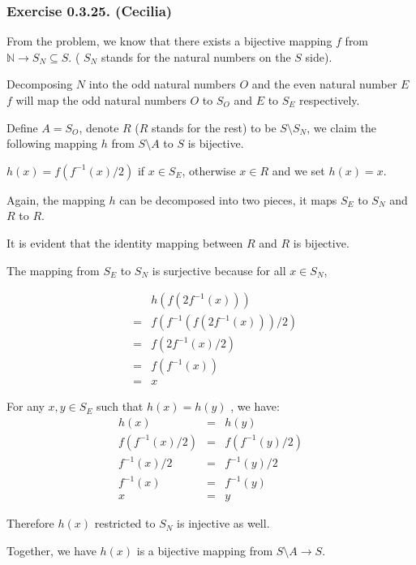 \subsubsection*{Exercise 0.3.25. (Cecilia)}

From the problem, we know that there exists a bijective mapping $ f $ from $ \mathbb{N} \to S_N \subseteq S $. ( $ S_N $ stands for the natural numbers on the $ S $ side).

Decomposing $ N $ into the odd natural numbers $ O $ and the even natural number $ E $ $ f $ will map the odd natural numbers $ O $ to $ S_O $ and $ E $ to $ S_E $ respectively. 

Define $ A = S_O $, denote $ R $ ($ R $ stands for the rest) to be $ S \setminus S_N $, we claim the following mapping $ h $ from $ S \setminus A $ to $ S $ is bijective.

$ h(x) = f(f^{-1}(x)/2) $ if $ x \in S_E $, otherwise $ x \in R $ and we set $ h(x) = x $.

Again, the mapping $ h $ can be decomposed into two pieces, it maps $ S_E $ to $ S_N $ and $ R $ to $ R $.

It is evident that the identity mapping between $ R $ and $ R $ is bijective.

The mapping from $ S_E $ to $ S_N $ is surjective because for all $ x \in S_N $, 

\begin{eqnarray*}
  & & h(f(2f^{-1}(x))) \\
  &=& f(f^{-1}(f(2f^{-1}(x)))/2) \\
  &=& f(2f^{-1}(x)/2) \\
  &=& f(f^{-1}(x)) \\
  &=& x
\end{eqnarray*}

For any $ x, y \in S_E $ such that $ h(x) = h(y) $ , we have:
\begin{eqnarray*}
              h(x) &=& h(y) \\
    f(f^{-1}(x)/2) &=& f(f^{-1}(y)/2) \\
       f^{-1}(x)/2 &=& f^{-1}(y)/2 \\
         f^{-1}(x) &=& f^{-1}(y) \\
                x &=& y 
  \end{eqnarray*}

  Therefore $ h(x) $ restricted to $ S_N $ is injective as well.

  Together, we have $ h(x) $ is a bijective mapping from $ S \setminus A \to S $.
